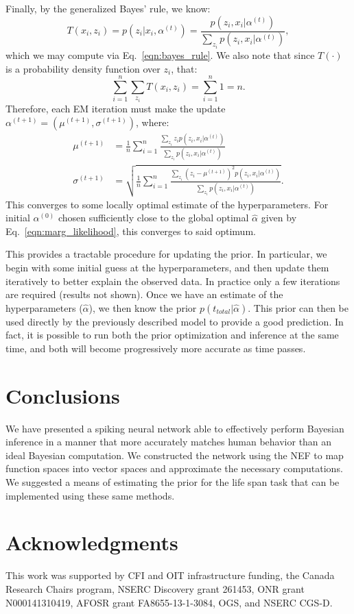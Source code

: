 \documentclass[10pt,letterpaper]{article}
\begin{document}
Finally, by the generalized Bayes' rule, we know:
$$
T(x_i, z_i) = p(z_i | x_i, \alpha^{(t)}) = \frac{p(z_i, x_i | \alpha^{(t)})}{ \sum_{z_i} p(z_i, x_i | \alpha^{(t)}) } ,
$$
which we may compute via Eq.~\ref{eqn:bayes_rule}.
We also note that since $T(\cdot)$ is a probability density function over $z_i$, that:
$$
\sum_{i=1}^n \sum_{z_i} T(x_i, z_i) = \sum_{i=1}^n 1 = n .
$$
Therefore, each EM iteration must make the update $\alpha^{(t+1)} = (\mu^{(t+1)}, \sigma^{(t+1)})$, where:
\begin{equation}
\begin{aligned}
\mu^{(t+1)} &= \frac{1}{n} \sum_{i=1}^n \frac{\sum_{z_i} z_i p(z_i, x_i | \alpha^{(t)})}{\sum_{z_i} p(z_i, x_i | \alpha^{(t)})} \\
\sigma^{(t+1)} &= \sqrt{\frac{1}{n}  \sum_{i=1}^n \frac{\sum_{z_i} (z_i - \mu^{(t+1)})^2 p(z_i, x_i | \alpha^{(t)})}{\sum_{z_i} p(z_i, x_i | \alpha^{(t)})}} .
\end{aligned}
\end{equation}
This converges to some locally optimal estimate of the hyperparameters. For initial $\alpha^{(0)}$ chosen sufficiently close to the global optimal $\hat{\alpha}$ given by Eq.~\ref{eqn:marg_likelihood}, this converges to said optimum.

This provides a tractable procedure for updating the prior. In particular, we begin with some initial guess at the hyperparameters, and then update them iteratively to better explain the observed data. In practice only a few iterations are required (results not shown).  
Once we have an estimate of the hyperparameters ($\hat{\alpha}$), we then know the prior $p(t_{total} | \hat{\alpha})$. This prior can then be used directly by the previously described model to provide a good prediction.  In fact, it is possible to run both the prior optimization and inference at the same time, and both will become progressively more accurate as time passes.

\section{Conclusions}

We have presented a spiking neural network able to effectively perform Bayesian inference in a manner that more accurately matches human behavior than an ideal Bayesian computation.  We constructed the network using the NEF to map function spaces into vector spaces and approximate the necessary computations.  We suggested a means of estimating the prior for the life span task that can be implemented using these same methods.


\section{Acknowledgments}
This work was supported by CFI and OIT infrastructure funding, the Canada Research Chairs program, NSERC Discovery grant 261453, ONR grant N000141310419, AFOSR grant FA8655-13-1-3084, OGS, and NSERC CGS-D.



\setlength{\bibleftmargin}{.125in}
\setlength{\bibindent}{-\bibleftmargin}


\end{document}
